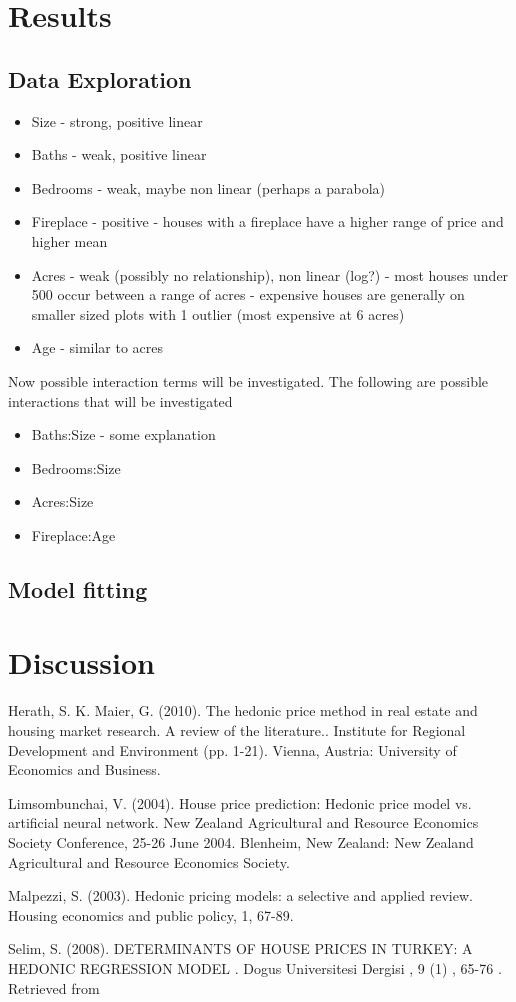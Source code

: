 \documentclass[10pt,A4,makeidx]{article}
\begin{document}
\section{Results}
  \subsection{Data Exploration}
  \begin{itemize}
    \item Size - strong, positive linear
    \item Baths - weak, positive linear
    \item Bedrooms - weak, maybe non linear (perhaps a parabola)
    \item Fireplace - positive - houses with a fireplace have a higher range of price
    and higher mean
    \item Acres - weak (possibly no relationship), non linear (log?) - most houses under 
    500 occur between a range of acres - expensive houses are generally on smaller
    sized plots with 1 outlier (most expensive at 6 acres)
    \item Age - similar to acres 
  \end{itemize}

  Now possible interaction terms will be investigated. The following are possible 
  interactions that will be investigated
  \begin{itemize}
  \item Baths:Size - some explanation
  \item Bedrooms:Size
  \item Acres:Size
  \item Fireplace:Age
  \end{itemize}

  \subsection{Model fitting}
\section{Discussion}


\begin{thebibliography}{9}
Herath, S. K. Maier, G. (2010). The hedonic price method in real estate and housing market research. A review of the literature.. Institute for Regional Development and Environment (pp. 1-21). Vienna, Austria: University of Economics and Business.

Limsombunchai, V. (2004). House price prediction: Hedonic price model vs. artificial neural network. New Zealand Agricultural and Resource Economics Society Conference, 25-26 June 2004. Blenheim, New Zealand: New Zealand Agricultural and Resource Economics Society.

Malpezzi, S. (2003). Hedonic pricing models: a selective and applied review. Housing economics and public policy, 1, 67-89.

Selim, S. (2008). DETERMINANTS OF HOUSE PRICES IN TURKEY: A HEDONIC REGRESSION MODEL . Dogus Universitesi Dergisi , 9 (1) , 65-76 . Retrieved from 
\end{thebibliography}
\end{document}
